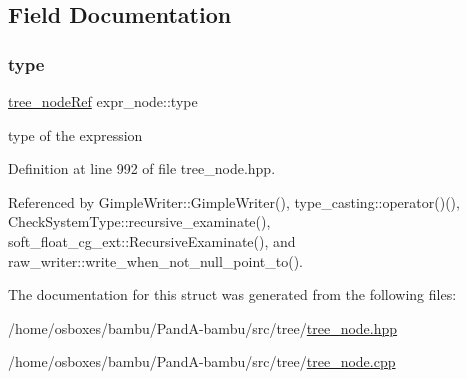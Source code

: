 \subsection{Field Documentation}
\mbox{\label{structexpr__node_a577cee1f950ec08ade2c3bde0554de12}} 
\subsubsection{\texorpdfstring{type}{type}}
{\footnotesize\ttfamily \hyperlink{tree__node_8hpp_a6ee377554d1c4871ad66a337eaa67fd5}{tree\+\_\+node\+Ref} expr\+\_\+node\+::type}



type of the expression 



Definition at line 992 of file tree\+\_\+node.\+hpp.



Referenced by Gimple\+Writer\+::\+Gimple\+Writer(), type\+\_\+casting\+::operator()(), Check\+System\+Type\+::recursive\+\_\+examinate(), soft\+\_\+float\+\_\+cg\+\_\+ext\+::\+Recursive\+Examinate(), and raw\+\_\+writer\+::write\+\_\+when\+\_\+not\+\_\+null\+\_\+point\+\_\+to().



The documentation for this struct was generated from the following files\+:\begin{DoxyCompactItemize}
\item 
/home/osboxes/bambu/\+Pand\+A-\/bambu/src/tree/\hyperlink{tree__node_8hpp}{tree\+\_\+node.\+hpp}\item 
/home/osboxes/bambu/\+Pand\+A-\/bambu/src/tree/\hyperlink{tree__node_8cpp}{tree\+\_\+node.\+cpp}\end{DoxyCompactItemize}
